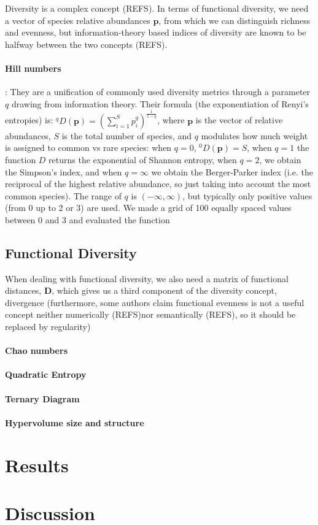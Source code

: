 \documentclass[a4paper, 9pt]{article}
\newcommand{\refs}{(\alert{REFS})}
\begin{document}
	Diversity is a complex concept \refs. In terms of functional diversity, we need a vector of species relative abundances $\mathbf{p}$, from which we can distinguish richness and evenness, but information-theory based indices of diversity are known to be halfway between the two concepts \refs.
	
	\paragraph*{Hill numbers}: They are a unification of commonly used diversity metrics through a parameter $q$ drawing from information theory. Their formula (the exponentiation of Renyi's entropies) is:
	$^qD(\mathbf{p}) = \left(\sum_{i = 1}^{S} p_i^q\right)^{\frac 1 {1-q}}$, where $\mathbf{p}$ is the vector of relative abundances, $S$ is the total number of species, and $q$ modulates how much weight is assigned to common vs rare species: when $q=0$, $^0D(\mathbf{p}) = S$, when $q = 1$ the function $D$ returns the exponential of Shannon entropy, when $q = 2$, we obtain the Simpson's index, and when $q = \infty$ we obtain the Berger-Parker index (i.e. the reciprocal of the highest relative abundance, so just taking into account the most common species). The range of $q$ is $(-\infty, \infty)$, but typically only positive values (from 0 up to 2 or 3) are used. We made a grid of 100 equally spaced values between 0 and 3 and evaluated the function 
	
	\subsection*{Functional Diversity}
	
	When dealing with functional diversity, we also need a matrix of functional distances, $\mathbf{D}$, which gives us a third component of the diversity concept, divergence (furthermore, some authors claim functional evenness is not a useful concept neither numerically \refs nor semantically \refs, so it should be replaced by regularity)
	
	\paragraph*{Chao numbers}
	
	\paragraph*{Quadratic Entropy}
	
	\paragraph*{Ternary Diagram}
	
	\paragraph*{Hypervolume size and structure}
	
	\section*{Results}
	\label{sec:res}
	
	\section*{Discussion}
	\label{sec:disc}
\end{document}
